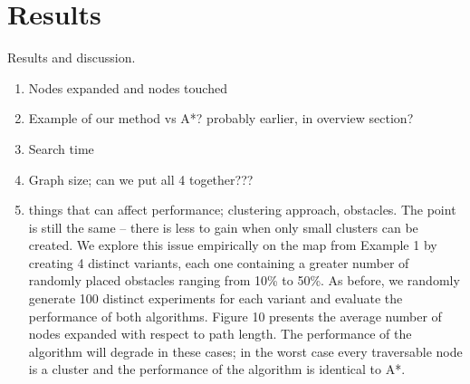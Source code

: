 \section{Results}
Results and discussion.
\begin{enumerate}
 \item{Nodes expanded and nodes touched}
 \item{Example of our method vs A*? probably earlier, in overview section?}
 \item{Search time}
 \item{Graph size; can we put all 4 together???}
 \item{things that can affect performance; clustering approach, obstacles. 
	The point is still the same -- there is less to gain when only small
	clusters can be created. 
	We explore this issue empirically on the map from Example 1 by creating 4 distinct
	variants, each one containing a greater number of randomly placed obstacles
	ranging from 10\% to 50\%. 
	As before, we randomly generate 100 distinct experiments for each variant and evaluate
	the performance of both algorithms. 
	Figure 10 presents the average number of nodes expanded with respect to path length. 
	The performance of the algorithm will degrade in these cases; in the worst
	case every traversable node is a cluster and the performance of the algorithm is
	identical to A*. }
\end{enumerate}
